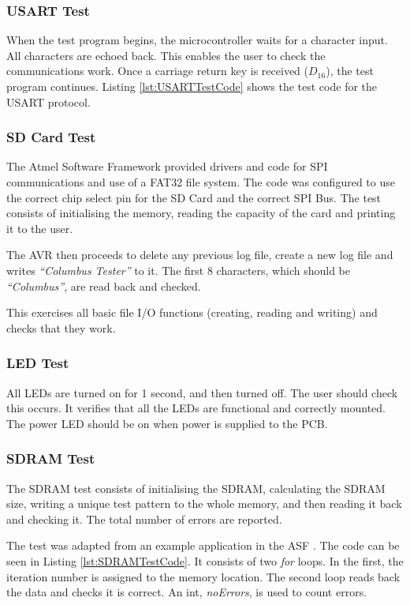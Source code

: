 \subsubsection{USART Test}\label{USART:Test}
When the test program begins, the microcontroller waits for a character input. All characters are echoed back. This enables the user to check the communications work. Once a carriage return key is received ($D_{16}$), the test program continues. Listing \ref{lst:USARTTestCode} shows the test code for the USART protocol.


\subsubsection{SD Card Test}\label{SD:Test}
The Atmel Software Framework \citep{Atmel:ASF} provided drivers and code for SPI communications and use of a FAT32 file system. The code was configured to use the correct chip select pin for the SD Card and the correct SPI Bus. The test consists of initialising the memory, reading the capacity of the card and printing it to the user. 

The AVR then proceeds to delete any previous log file, create a new log file and writes \textit{``Columbus Tester''} to it. The first 8 characters, which should be \textit{``Columbus''}, are read back and checked.

This exercises all basic file I/O functions (creating, reading and writing) and checks that they work.

\subsubsection{LED Test}\label{LED:Test}
All LEDs are turned on for 1 second, and then turned off. The user should check this occurs. It verifies that all the LEDs are functional and correctly mounted. The power LED should be on when power is supplied to the PCB. 

\subsubsection{SDRAM Test}\label{SDRAM:Test}
The SDRAM test consists of initialising the SDRAM, calculating the SDRAM size, writing a unique test pattern to the whole memory, and then reading it back and checking it. The total number of errors are reported. 

The test was adapted from an example application in the ASF \citep{Atmel:ASF}. The code can be seen in Listing \ref{lst:SDRAMTestCode}. It consists of two \textit{for} loops. In the first, the iteration number is assigned to the memory location. The second loop reads back the data and checks it is correct. An int, \textit{noErrors}, is used to count errors. 

